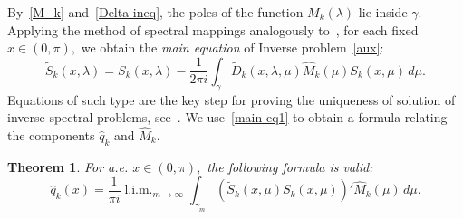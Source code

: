 \documentclass[a4paper, 12pt] {article}
\theoremstyle{plain}
\newtheorem{theorem}{\indent Theorem}
\theoremstyle{remark}
\theoremstyle{plain}
\theoremstyle{definition}
\numberwithin{equation}{section}
\begin{document}
By~\eqref{M_k} and~\eqref{Delta ineq}, the poles of the function $M_k(\lambda)$ lie inside $\gamma.$
Applying the method of spectral mappings analogously to~\cite[\S1.6.1]{freil},
for each fixed $x\in(0, \pi),$ we obtain the {\it main equation} of Inverse problem~\ref{aux}:
\begin{equation} \label{main eq1}
\tilde S_k(x, \lambda) = S_k(x, \lambda) - \frac{1}{2\pi i} \mathop{\int}_{\gamma}  {\tilde D}_k(x, \lambda, \mu) \hat M_k(\mu) S_k(x, \mu) \, d\mu.
\end{equation}
Equations of such type are the key step for proving the uniqueness of solution of inverse spectral problems, see~\cite{freil}.
We use~\eqref{main eq1} to obtain a formula relating the components $\hat q_k$ and $\hat M_k.$

\begin{theorem} For a.e. $x \in (0, \pi),$ the following formula is valid:
\begin{equation} \label{qq}
\hat q_k(x) = \frac{1}{\pi i} \mathop{l.i.m.}_{m \to \infty} \mathop{\int}_{\gamma_m} (\tilde S_k(x, \mu) S_k(x, \mu))' \hat M_k(\mu) \, d\mu.
\end{equation}
\end{theorem}
\end{document}
